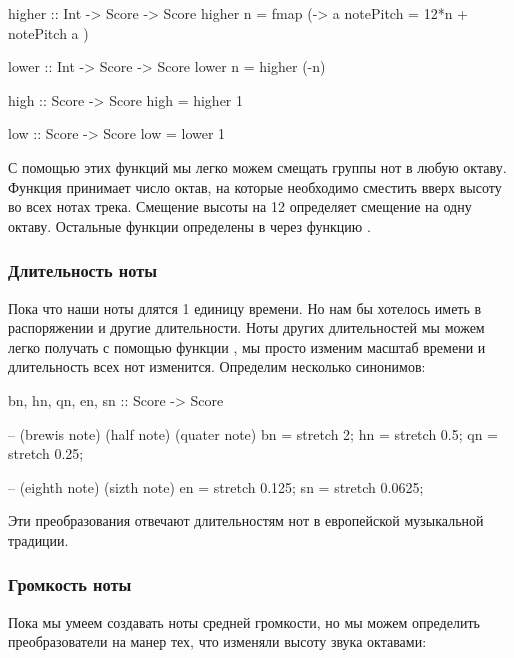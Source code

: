 \begin{code}
higher :: Int -> Score -> Score
higher n = fmap (\a -> a{ notePitch = 12*n + notePitch a })

lower :: Int -> Score -> Score 
lower n = higher (-n)

high :: Score -> Score
high = higher 1

low :: Score -> Score 
low = lower 1
\end{code}

С помощью этих функций мы легко можем смещать группы нот 
в любую октаву. Функция  принимает число октав,
на которые необходимо сместить вверх высоту во всех
нотах трека. Смещение высоты на 12 определяет смещение на
одну октаву. Остальные функции определены в через функцию
.


\subsubsection{Длительность ноты}

Пока что наши ноты длятся 1 единицу времени. Но нам бы хотелось
иметь в распоряжении и другие длительности. Ноты других
длительностей мы можем легко получать с помощью функции
, мы просто изменим масштаб времени и длительность
всех нот изменится. Определим несколько синонимов:

\begin{code}
bn, hn, qn, en, sn :: Score -> Score

-- (brewis note)   (half note)         (quater note)
bn = stretch 2;    hn = stretch 0.5;   qn = stretch 0.25;

-- (eighth note)      (sizth note)
en = stretch 0.125;   sn = stretch 0.0625;
\end{code}

Эти преобразования отвечают длительностям нот в 
европейской музыкальной традиции.

\subsubsection{Громкость ноты}

Пока мы умеем создавать ноты средней громкости, но
мы можем определить преобразователи на манер тех,
что изменяли высоту звука октавами:


